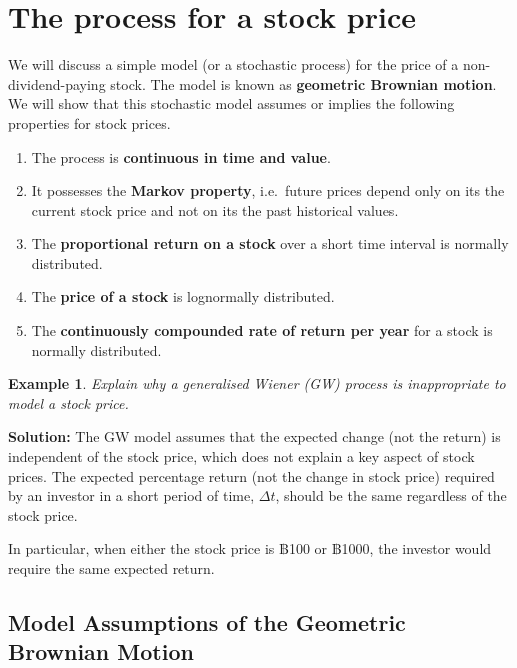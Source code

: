 \documentclass[
]{book}
\theoremstyle{definition}
\theoremstyle{definition}
\newtheorem{example}{Example}[chapter]
\theoremstyle{definition}
\theoremstyle{definition}
\theoremstyle{remark}
\begin{document}
\hypertarget{the-process-for-a-stock-price}{%
\section{The process for a stock price}\label{the-process-for-a-stock-price}}

We will discuss a simple model (or a stochastic process) for the price
of a non-dividend-paying stock. The model is known as \textbf{geometric
Brownian motion}. We will show that this stochastic model assumes or
implies the following properties for stock prices.

\begin{enumerate}
\def\labelenumi{\arabic{enumi}.}
\item
  The process is \textbf{continuous in time and value}.
\item
  It possesses the \textbf{Markov property}, i.e.~future prices depend only
  on its the current stock price and not on its the past historical
  values.
\item
  The \textbf{proportional return on a stock} over a short time interval is
  normally distributed.
\item
  The \textbf{price of a stock} is lognormally distributed.
\item
  The \textbf{continuously compounded rate of return per year} for a stock
  is normally distributed.
\end{enumerate}

\begin{example}
\emph{Explain why a generalised Wiener (GW) process is inappropriate to model
a stock price.}
\end{example}

\textbf{Solution:} The GW model assumes that the expected change (not the
return) is independent of the stock price, which does not explain a key
aspect of stock prices. The expected percentage return (not the change
in stock price) required by an investor in a short period of time,
\(\Delta t\), should be the same regardless of the stock price.

In particular, when either the stock price is ฿100 or ฿1000, the
investor would require the same expected return.

\hypertarget{model-assumptions-of-the-geometric-brownian-motion}{%
\subsection{Model Assumptions of the Geometric Brownian Motion}\label{model-assumptions-of-the-geometric-brownian-motion}}
\end{document}
